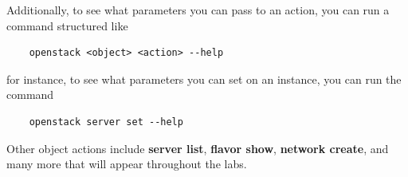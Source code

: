 \documentclass[letterpaper, 12pt]{article}
\begin{document}
Additionally, to see what parameters you can pass to an action, you can run a command structured like
\begin{lstlisting}
    openstack <object> <action> --help
\end{lstlisting}
\noindent
for instance, to see what parameters you can set on an instance, you can run the command
\begin{lstlisting}
    openstack server set --help
\end{lstlisting}
\noindent
Other object actions include \textbf{server list}, \textbf{flavor show}, \textbf{network create}, and many more that will appear throughout the labs.
\end{document}
